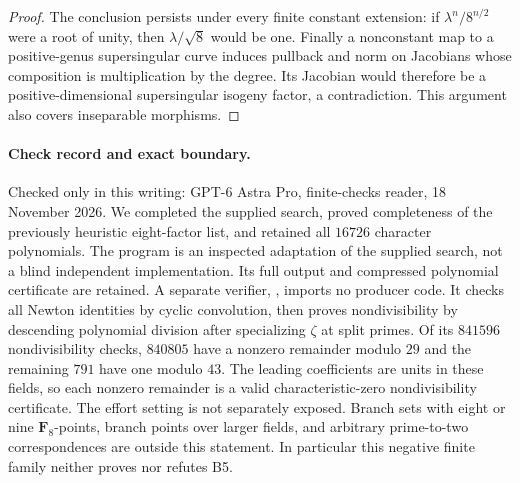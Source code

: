 \begin{proof}
The conclusion persists under every finite constant extension:
if $\lambda^n/8^{n/2}$ were a root of unity, then
$\lambda/\sqrt8$ would be one. Finally a nonconstant map to a
positive-genus supersingular curve induces pullback and norm on
Jacobians whose composition is multiplication by the degree.
Its Jacobian would therefore be a positive-dimensional
supersingular isogeny factor, a contradiction. This argument also
covers inseparable morphisms.
\end{proof}

\paragraph{Check record and exact boundary.}
Checked only in this writing: GPT-6 Astra Pro, finite-checks reader,
18 November 2026. We completed the supplied search, proved completeness
of the previously heuristic eight-factor list, and retained all
$16726$ character polynomials. The program
 is an inspected adaptation of the
supplied search, not a blind independent implementation. Its full
output and compressed polynomial certificate are retained. A separate verifier, , imports no
producer code. It checks all Newton identities by cyclic convolution,
then proves nondivisibility by descending polynomial division after
specializing $\zeta$ at split primes. Of its $841596$ nondivisibility
checks, $840805$ have a nonzero remainder modulo $29$ and the remaining
$791$ have one modulo $43$. The leading coefficients are units in
these fields, so each nonzero remainder is a valid characteristic-zero
nondivisibility certificate. The effort
setting is not separately exposed. Branch sets with eight or nine
$\mathbf F _8$-points, branch points over larger fields, and arbitrary
prime-to-two correspondences are outside this statement. In particular
this negative finite family neither proves nor refutes B5.
